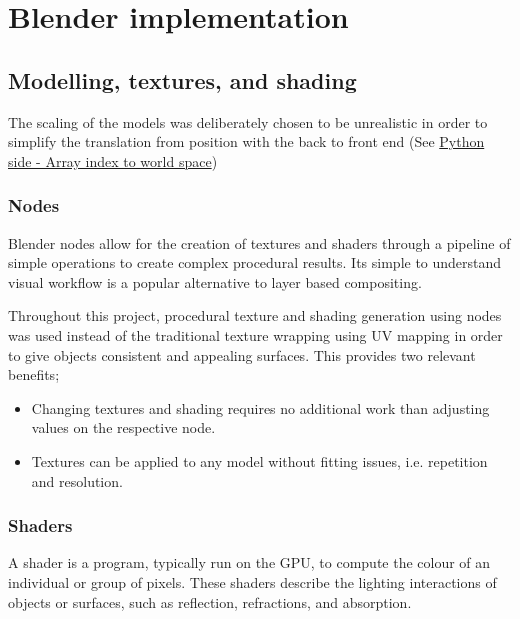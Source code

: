 \documentclass[11pt]{article}
\begin{document}
\section{Blender implementation}
\label{sec:org7ce99da}
\subsection{Modelling, textures, and shading}
\label{sec:orgbad0e81}
The scaling of the models was deliberately chosen to be unrealistic in order to
simplify the translation from position with the back to front end (See \hyperref[sec:org3045217]{Python
side - Array index to world space})
\subsubsection{Nodes}
\label{sec:org7f19a65}
Blender nodes allow for the creation of textures and shaders through a pipeline
of simple operations to create complex procedural results. Its simple to
understand visual workflow is a popular alternative to layer based compositing.
\cite{node-vs-layer}

Throughout this project, procedural texture and shading generation using nodes
was used instead of the traditional texture wrapping using UV mapping in order
to give objects consistent and appealing surfaces. This provides two relevant
benefits;
\begin{itemize}
\item Changing textures and shading requires no additional work than adjusting
values on the respective node.
\item Textures can be applied to any model without fitting issues, i.e. repetition
and resolution.
\end{itemize}
\subsubsection{Shaders}
\label{sec:orgf9cbb9c}
A shader is a program, typically run on the GPU, to compute the colour of an
individual or group of pixels. These shaders describe the lighting interactions
of objects or surfaces, such as reflection, refractions, and absorption.
\end{document}
